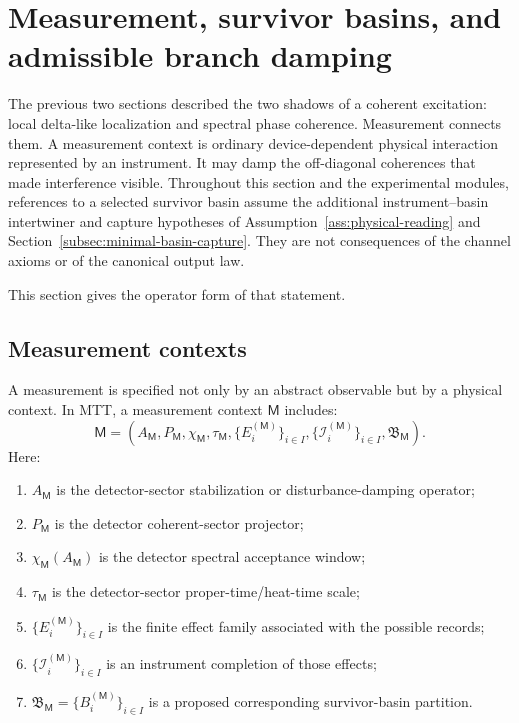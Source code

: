 \documentclass[11pt]{article}
\newcommand{\Meas}{\mathsf M}
\begin{document}
\section{Measurement, survivor basins, and admissible branch damping}
\label{sec:measurement-branch-damping}

The previous two sections described the two shadows of a coherent excitation: local
delta-like localization and spectral phase coherence. Measurement connects them. A
measurement context is ordinary device-dependent physical interaction represented by an
instrument. It may damp the off-diagonal coherences that made interference visible.
Throughout this section and the experimental modules, references to a selected survivor
basin assume the additional instrument--basin intertwiner and capture hypotheses of
Assumption~\ref{ass:physical-reading} and Section~\ref{subsec:minimal-basin-capture}.
They are not consequences of the channel axioms or of the canonical output law.

This section gives the operator form of that statement.

\subsection{Measurement contexts}
\label{subsec:measurement-contexts}

A measurement is specified not only by an abstract observable but by a physical context.
In MTT, a measurement context \(\Meas\) includes:
\begin{equation}
  \Meas
  =
  (A_{\Meas},P_{\Meas},\chi_{\Meas},\tau_{\Meas},
  \{E_i^{(\Meas)}\}_{i\in I},
  \{\mathcal I_i^{(\Meas)}\}_{i\in I},
  \mathfrak B_{\Meas}).
  \label{eq:measurement-context-data}
\end{equation}
Here:
\begin{enumerate}[label=(\roman*)]
  \item \(A_{\Meas}\) is the detector-sector stabilization or disturbance-damping operator;
  \item \(P_{\Meas}\) is the detector coherent-sector projector;
  \item \(\chi_{\Meas}(A_{\Meas})\) is the detector spectral acceptance window;
  \item \(\tau_{\Meas}\) is the detector-sector proper-time/heat-time scale;
  \item \(\{E_i^{(\Meas)}\}_{i\in I}\) is the finite effect family associated with the possible
  records;
  \item \(\{\mathcal I_i^{(\Meas)}\}_{i\in I}\) is an instrument completion of those effects;
  \item \(\mathfrak B_{\Meas}=\{B_i^{(\Meas)}\}_{i\in I}\) is a proposed corresponding survivor-basin
  partition.
\end{enumerate}
\end{document}
